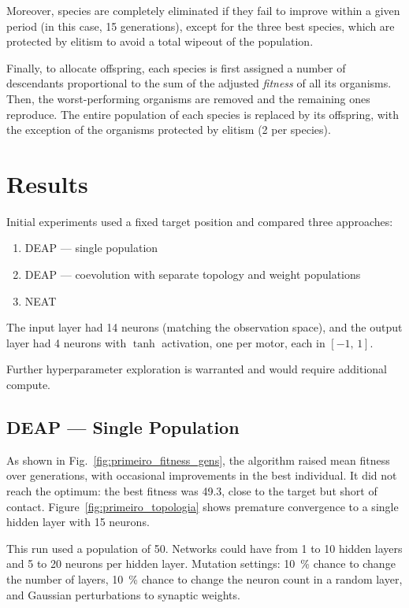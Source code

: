 \documentclass[12pt]{article}
\theoremstyle{definition}
\begin{document}
Moreover, species are completely eliminated if they fail to improve within a given period (in this case, 15 generations), except for the three best species, which are protected by elitism to avoid a total wipeout of the population.

Finally, to allocate offspring, each species is first assigned a number of descendants proportional to the sum of the adjusted \textit{fitness} of all its organisms. Then, the worst-performing organisms are removed and the remaining ones reproduce. The entire population of each species is replaced by its offspring, with the exception of the organisms protected by elitism (2 per species).

\section{Results}
Initial experiments used a fixed target position and compared three approaches:
\begin{enumerate}
    \item DEAP — single population
    \item DEAP — coevolution with separate topology and weight populations
    \item NEAT
\end{enumerate}
The input layer had 14 neurons (matching the observation space), and the output layer had 4 neurons with $\tanh$ activation, one per motor, each in $[-1,\,1]$.

Further hyperparameter exploration is warranted and would require additional compute.

\subsection{DEAP — Single Population}
As shown in Fig.~\ref{fig:primeiro_fitness_gens}, the algorithm raised mean fitness over generations, with occasional improvements in the best individual. It did not reach the optimum: the best fitness was \num{49.3}, close to the target but short of contact. Figure~\ref{fig:primeiro_topologia} shows premature convergence to a single hidden layer with \num{15} neurons.

This run used a population of 50. Networks could have from \num{1} to \num{10} hidden layers and \num{5} to \num{20} neurons per hidden layer. Mutation settings: \SI{10}{\percent} chance to change the number of layers, \SI{10}{\percent} chance to change the neuron count in a random layer, and Gaussian perturbations to synaptic weights.
\end{document}
